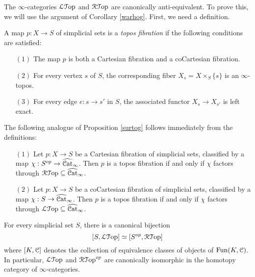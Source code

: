 The $\infty$-categories $\operatorname{\mathcal{L}{\mathcal T}op}$ and $\operatorname{\mathcal{R}{\mathcal T}op}$ are canonically anti-equivalent. To prove this, we will use the argument of Corollary \ref{warhog}. First, we need a definition.

\begin{definition}\label{skuzz}
A map $p: X \rightarrow S$ of simplicial sets is a {\it topos fibration} if the following conditions are satisfied:
\begin{itemize}
\item[$(1)$] The map $p$ is both a Cartesian fibration and a coCartesian fibration.
\item[$(2)$] For every vertex $s$ of $S$, the corresponding fiber $X_{s} = X \times_{S} \{s\}$ is an $\infty$-topos.
\item[$(3)$] For every edge $e: s \rightarrow s'$ in $S$, the associated functor
$X_{s} \rightarrow X_{s'}$ is left exact.
\end{itemize}
\end{definition}

The following analogue of Proposition \ref{surtog} follows immediately from the definitions:

\begin{proposition}\label{surtog2}
\begin{itemize}
\item[$(1)$] Let $p: X \rightarrow S$ be a Cartesian fibration of simplicial sets, classified
by a map $\chi: S^{op} \rightarrow \widehat{\operatorname{\mathcal{C}at}}_{\infty}$. Then $p$ is a topos fibration if and only if $\chi$ factors through $\operatorname{\mathcal{R}{\mathcal T}op} \subseteq \widehat{\operatorname{\mathcal{C}at}}_{\infty}$. 

\item[$(2)$] Let $p: X \rightarrow S$ be a coCartesian fibration of simplicial sets, classified by a map $\chi: S \rightarrow \widehat{\operatorname{\mathcal{C}at}}_{\infty}$. Then $p$ is a topos fibration if and only if
$\chi$ factors through $\operatorname{\mathcal{L}{\mathcal T}op} \subseteq \widehat{\operatorname{\mathcal{C}at}}_{\infty}$.
\end{itemize}
\end{proposition}

\begin{corollary}\label{suytoy}
For every simplicial set $S$, there is a canonical bijection
$$ [ S, \operatorname{\mathcal{L}{\mathcal T}op} ] \simeq [ S^{op}, \operatorname{\mathcal{R}{\mathcal T}op} ]$$
where $[K, \operatorname{\mathcal{C}}]$ denotes the collection of equivalence classes of objects of $\operatorname{Fun}(K,\operatorname{\mathcal{C}})$.
In particular, $\operatorname{\mathcal{L}{\mathcal T}op}$ and $\operatorname{\mathcal{R}{\mathcal T}op}^{op}$ are canonically isomorphic
in the homotopy category of $\infty$-categories.
\end{corollary}

